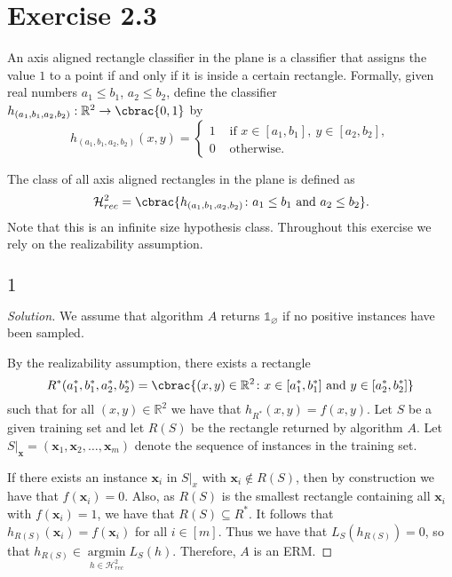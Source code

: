 \documentclass[10pt, a4paper, twoside]{amsart}
\newcommand{\R}{\ensuremath{\mathbb{R}}}
\DeclarePairedDelimiter\cbrac\{\}
\renewcommand{\c}{\ensuremath{\colon}}
\newcommand{\se}{\ensuremath{\subseteq}}
\newcommand{\Ind}{\ensuremath{\mathbb{1}}}
\newcommand{\argmin}{\operatorname*{argmin}}
\newenvironment{solution}
               {\let\oldqedsymbol=\qedsymbol
                \renewcommand{\qedsymbol}{$\blacktriangleleft$}
                \begin{proof}[Solution]}
               {\end{proof}
                \renewcommand{\qedsymbol}{\oldqedsymbol}}
\begin{document}
\section*{Exercise 2.3}
An axis aligned rectangle classifier in the plane is a classifier that assigns the value $1$ to a point 
if and only if it is inside a certain rectangle. 
Formally, given real numbers $a_1 \leq b_1$, $a_2 \leq b_2$, define the classifier $h_{(a_1, b_1, a_2, b_2)}:\R^2\to\cbrac{0,1}$ by
\begin{equation*}
h_{(a_1, b_1, a_2, b_2)}(x, y)=
\begin{cases}
 1 & \text{ if }x \in [a_1, b_1], \ y \in [a_2, b_2], \\
 0 & \text{ otherwise}.
\end{cases}
\end{equation*}

The class of all axis aligned rectangles in the plane is defined as
\begin{equation*}
\mathcal{H}^2_{rec}=\cbrac{h_{(a_1, b_1, a_2, b_2)} \c a_1 \leq b_1 \text{ and } a_2 \leq b_2}.
\end{equation*}
Note that this is an infinite size hypothesis class. Throughout this exercise we rely on the realizability assumption.

\subsection*{$1$}
\begin{solution}
We assume that algorithm $A$ returns $\Ind_{\varnothing}$ if no positive instances have been sampled.

By the realizability assumption, there exists a rectangle 
\begin{equation*}
R^*(a_1^*,b_1^*,a_2^*,b_2^*)=\cbrac{(x,y)\in \R^2 \c x \in [a_1^*,b_1^*] \text{ and }y \in [a_2^*, b_2^*]}
\end{equation*}
such that for all $(x, y) \in \R^2$ we have that
$h_{R^*}(x, y)=f(x, y)$. Let $S$ be a given training set and let $R(S)$ be the rectangle returned by algorithm $A$. 
Let $S|_{\mathbf{x}}=(\mathbf{x}_1, \mathbf{x}_2, \ldots, \mathbf{x}_m)$ denote the sequence of instances in the training set.

If there exists an instance $\mathbf{x}_i$ in $S|_{x}$ with $\mathbf{x}_i \notin R(S)$, 
then by construction we have that $f(\mathbf{x}_i)=0$.
Also, as $R(S)$ is the smallest rectangle containing all $\mathbf{x}_i$ with $f(\mathbf{x}_i)=1$,
we have that $R(S)\se R^*$. It follows that $h_{R(S)}(\mathbf{x}_i)=f(\mathbf{x}_i)$ for all $i \in [m]$.
Thus we have that $L_S(h_{R(S)})=0$, so that $h_{R(S)} \in \argmin\limits_{h \in \mathcal{H}^2_{rec}}L_S(h)$.
Therefore, $A$ is an ERM.
\end{solution}
\end{document}
